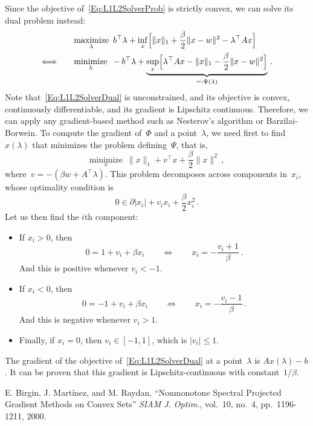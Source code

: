 \documentclass[letter,10pt]{article}
\theoremstyle{definition}
\theoremstyle{nonumberplain}
\begin{document}
	
	Since the objective of~\eqref{Eq:L1L2SolverProb} is strictly convex, we can solve its dual problem instead:
	\begin{align}
		  &\underset{\lambda}{\text{maximize}}\,\,\, b^\top \lambda + \inf_x \Bigl[ \|x\|_1 + \frac{\beta}{2}\|x - w\|^2 - \lambda^\top Ax\Bigr] 
		\notag
		\\
		\Longleftrightarrow\qquad&
		  \underset{\lambda}{\text{minimize}}\,\,\, -b^\top \lambda + \underbrace{\sup_x \Bigl[\lambda^\top Ax - \|x\|_1 - \frac{\beta}{2}\|x - w\|^2 \Bigr]}_{=: \Psi(\lambda)}\,.	
		\label{Eq:L1L2SolverDual}
	\end{align}
	Note that~\eqref{Eq:L1L2SolverDual} is unconstrained, and its objective is convex, continuously differentiable, and its gradient is Lipschitz continuous. Therefore, we can apply any gradient-based method such as Nesterov's algorithm or Barzilai-Borwein. To compute the gradient of~$\Phi$ and a point~$\lambda$, we need first to find $x(\lambda)$ that minimizes the problem defining~$\Psi$, that is,
	$$		
			\underset{x}{\text{minimize}} \,\,\, \|x\|_1 + v^\top x + \frac{\beta}{2}\|x\|^2\,,
	$$
	where~$v = -(\beta w + A^\top \lambda)$. This problem decomposes across components in~$x_i$, whose optimality condition is
	$$
		0 \in \partial |x_i| + v_ix_i + \frac{\beta}{2}x_i^2\,.
	$$
	Let us then find the $i$th component:
	\begin{itemize}
		\item If $x_i > 0$, then 
			$$
				0 = 1 + v_i + \beta x_i \qquad\Longleftrightarrow\qquad x_i = -\frac{v_i + 1}{\beta}\,.
			$$
			And this is positive whenever $v_i < -1$.
		
		\item If $x_i < 0$, then
			$$
				0 = -1 + v_i + \beta x_i \qquad\Longleftrightarrow\qquad x_i = -\frac{v_i - 1}{\beta}\,.
			$$
			And this is negative whenever $v_i > 1$.
		
		\item Finally, if $x_i = 0$, then $v_i \in [-1,1]$, which is $|v_i| \leq 1$.
	\end{itemize}
	The gradient of the objective of~\eqref{Eq:L1L2SolverDual} at a point~$\lambda$ is $Ax(\lambda) - b$. It can be proven that this gradient is Lipschitz-continuous with constant~$1/\beta$.
	

	
	\begin{thebibliography}{9}
	
			E. Birgin, J. Mart\'inez, and M. Raydan,
			``Nonmonotone Spectral Projected Gradient Methods on Convex Sets''
			\emph{SIAM J. Optim.}, 
			vol.\ 10, no.\ 4, pp.\ 1196-1211, 2000.
	
	\end{thebibliography}

	
	
\end{document}
